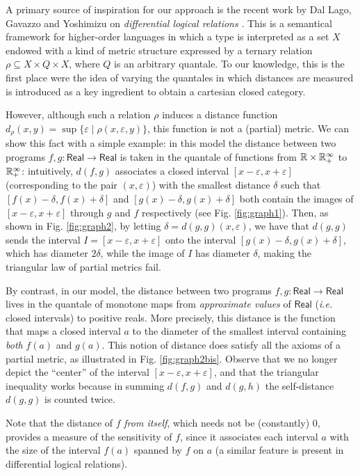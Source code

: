 A primary source of inspiration for our approach is the recent work by Dal Lago, Gavazzo and Yoshimizu on  \emph{differential logical relations} \cite{dallago:differential-stlc}. This is a semantical framework for higher-order languages in which a type is interpreted as a set $X$ endowed with a kind of metric structure expressed by a ternary relation $\rho \subseteq X\times Q\times X$, where $Q$ is an arbitrary quantale. To our knowledge, this is the first place were the idea of varying the quantales in which distances are measured is introduced as a key ingredient to obtain a cartesian closed category.

However, although such a relation $\rho$ induces a distance function $d_{\rho}(x,y)=\sup\{\varepsilon\mid \rho(x,\varepsilon,y)\}$, this function is not a (partial) metric. We can show this fact with a simple example: in this model the distance between two programs 
 $f,g:\mathsf{Real}\to \mathsf{Real}$ is taken in the quantale of functions from $\mathbb{R}\times \mathbb{R}_{+}^{\infty}$ to $\mathbb{R}_{+}^{\infty}$: intuitively, 
  $d(f,g)$ associates a closed interval $[x-\varepsilon,x+\varepsilon]$ (corresponding to the pair $(x,\varepsilon)$) with the smallest distance $\delta$ such that $[ f(x)-\delta, f(x)+\delta]$ and $[g(x)-\delta,g(x)+\delta]$ both contain the images of $[x-\varepsilon, x+\varepsilon]$ through
 $g$ and $f$ respectively (see Fig. \ref{fig:graph1}). Then, as shown in Fig. \ref{fig:graph2}, by letting $\delta=d(g,g)(x,\varepsilon)$, we have that $d(g,g)$ sends the interval $I=[x-\varepsilon, x+\varepsilon]$ onto the interval $[g(x)-\delta, g(x)+\delta]$, which has diameter $2\delta$, while the image of $I$ has diameter $\delta$, making the triangular law of partial metrics fail. 

By contrast, in our model, the distance between two programs $f,g:\mathsf{Real}\to \mathsf{Real}$ lives in the quantale of monotone maps from \emph{approximate values} of $\mathsf{Real}$ (\emph{i.e.} closed intervals) to positive reals. More precisely, this distance is the function that maps a closed interval $a$ to the diameter of the smallest interval containing \emph{both} $f(a)$ and $g(a)$. 
This notion of distance does satisfy all the axioms of a partial metric, as illustrated in Fig. \ref{fig:graph2bis}. Observe that  we no longer depict the ``center'' of the interval $[x-\varepsilon, x+\varepsilon]$, and that the triangular inequality works because in summing $d(f,g)$ and $d(g,h)$ the self-distance $d(g,g)$ is  counted twice. 

Note that the distance of $f$ \emph{from itself}, which needs not be (constantly) 0,  provides a measure of the sensitivity of $f$, since it associates each interval $a$ with the size of the interval $f(a)$ spanned by $f$ on $a$ (a similar feature is present in differential logical relations). 
 
